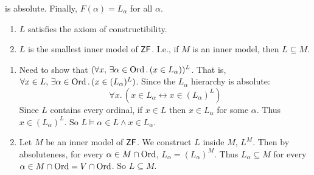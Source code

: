 \documentclass{article}
\begin{document}
is absolute. Finally, $F(\alpha)=L_{\alpha}$ for all $\alpha$. \endproof
\begin{fancythm}{}\hspace{0.1cm}
    \begin{enumerate}
        \item[(i)] $L$ satisfies the axiom of constructibility.
        \item[(ii)] $L$ is the smallest inner model of $\mathsf{ZF}$. I.e., if $M$ is an inner model, then $L \subseteq M$.
    \end{enumerate}
\end{fancythm}
\proof \hspace{0.1cm} \begin{enumerate}
    \item[(i)] Need to show that $(\forall x, \, \exists \alpha \in \operatorname{Ord}. \, (x \in L_{\alpha}))^{L}$. That is, $\forall x \in L, \, \exists \alpha \in \operatorname{Ord}. \, (x \in (L_{\alpha})^{L})$. Since the $L_{\alpha}$ hierarchy is absolute: \[ \forall x. \,(x \in L_{\alpha} \leftrightarrow x \in (L_{\alpha})^{L})\]
          Since $L$ contains every ordinal, if $x \in L$ then $x \in L_{\alpha}$ for some $\alpha$. Thus $x \in (L_{\alpha})^{L}$. So $L \models \alpha \in L \wedge x \in L_{\alpha}$.
    \item[(ii)] Let $M$ be an inner model of $\mathsf{ZF}$. We construct $L$ inside $M$, $L^{M}$. Then by absoluteness, for every $\alpha \in M \cap \operatorname{Ord}$, $L_{\alpha} = (L_{\alpha})^{M}$. Thus $L_{\alpha} \subseteq M$ for every $\alpha \in M \cap \operatorname{Ord} = V \cap \operatorname{Ord}$. So $L \subseteq M$.
\end{enumerate}
\endproof
\end{document}
